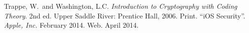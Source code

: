 \begin{thebibliography}{1}
 Trappe, W.\ and Washington, L.C. \textit{Introduction to Cryptography with Coding Theory}. 2nd ed. Upper Saddle River: Prentice Hall, 2006. Print.
 ``iOS Security''. \textit{Apple, Inc.} February 2014. Web. April 2014.
\end{thebibliography}
